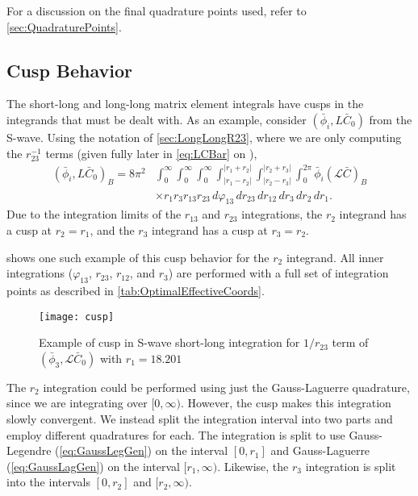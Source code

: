 \documentclass[Dissertation.tex]{subfiles}
\begin{document}

For a discussion on the final quadrature points used, refer to \cref{sec:QuadraturePoints}.




\subsection{Cusp Behavior}
\label{sec:Cusps}

The short-long and long-long matrix element integrals have cusps in the
integrands that must be dealt with. As an example, consider
$(\bar{\phi}_i, L\bar{C}_0)$ from the S-wave. Using the notation of
\cref{sec:LongLongR23}, where we are only computing the $r_{23}^{-1}$ terms
(given fully later in \cref{eq:LCBar} on \pageref{eq:LCBar}),
\begin{align}
(\bar{\phi}_i, L\bar{C}_0)_B = 8\pi^2 & \int_0^\infty \int_0^\infty \int_0^\infty \int_{|r_1 - r_2|}^{|r_1 + r_2|} \int_{|r_2 - r_3|}^{|r_2 + r_3|} \int_0^{2\pi} \bar{\phi}_i (\mathcal{L} \bar{C})_B  \nonumber \\
& \times r_1 r_3 r_{13} r_{23}\, d\varphi_{13}\, dr_{23}\, dr_{12}\, dr_3\, dr_2\, dr_1.
\end{align}
Due to the integration limits of the $r_{13}$ and $r_{23}$ integrations, the
$r_2$ integrand has a cusp at $r_2 = r_1$, and the $r_3$ integrand has a cusp
at $r_3 = r_2$.

 shows one such example of this cusp behavior for the $r_2$ 
integrand. All inner integrations ($\varphi_{13}$, $r_{23}$, $r_{12}$, and $r_3$)
are performed with a full set of integration points as described in
\cref{tab:OptimalEffectiveCoords}.

\begin{figure}[H]
	\centering
	\texttt{[image: cusp]}
	\caption[Example of cusp in S-wave short-long integration]{Example of cusp
in S-wave short-long integration for $1/r_{23}$ term of
$(\bar{\phi}_3, \mathcal{L}\bar{C}_0)$ with \mbox{$r_1 = 18.201$}}
	\label{fig:cusp}
\end{figure}

The $r_2$ integration could be performed using just the Gauss-Laguerre 
quadrature, since we are integrating over $[0,\infty)$. However, the cusp 
makes this integration slowly convergent. We instead split the integration 
interval into two parts and employ different quadratures for each. The 
integration is split to use Gauss-Legendre (\cref{eq:GaussLegGen}) on the 
interval $[0,r_1]$ and Gauss-Laguerre (\cref{eq:GaussLagGen}) on the interval 
$[r_1,\infty)$. Likewise, the $r_3$ integration is split into the intervals
$[0,r_2]$ and $[r_2,\infty)$.
\end{document}
